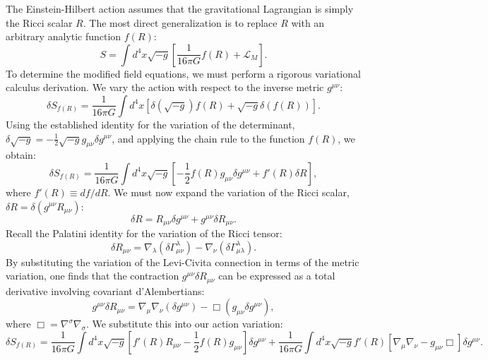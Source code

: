\documentclass[11pt, a4paper]{report}
\begin{document}
The Einstein-Hilbert action assumes that the gravitational Lagrangian is simply the Ricci scalar $R$. The most direct generalization is to replace $R$ with an arbitrary analytic function $f(R)$:
\begin{equation}
\label{eq:fR_action}
S = \int d^{4}x \sqrt{-g} \left[ \frac{1}{16\pi G} f(R) + \mathcal{L}_{M} \right].
\end{equation}
To determine the modified field equations, we must perform a rigorous variational calculus derivation. We vary the action with respect to the inverse metric $g^{\mu\nu}$:
\begin{equation}
\delta S_{f(R)} = \frac{1}{16\pi G} \int d^{4}x \left[ \delta(\sqrt{-g}) f(R) + \sqrt{-g} \delta(f(R)) \right].
\end{equation}
Using the established identity for the variation of the determinant, $\delta\sqrt{-g} = -\frac{1}{2}\sqrt{-g}g_{\mu\nu}\delta g^{\mu\nu}$, and applying the chain rule to the function $f(R)$, we obtain:
\begin{equation}
\delta S_{f(R)} = \frac{1}{16\pi G} \int d^{4}x \sqrt{-g} \left[ -\frac{1}{2}f(R)g_{\mu\nu}\delta g^{\mu\nu} + f'(R)\delta R \right],
\end{equation}
where $f'(R) \equiv df/dR$. We must now expand the variation of the Ricci scalar, $\delta R = \delta(g^{\mu\nu}R_{\mu\nu})$:
\begin{equation}
\label{eq:delta_R_expansion}
\delta R = R_{\mu\nu}\delta g^{\mu\nu} + g^{\mu\nu}\delta R_{\mu\nu}.
\end{equation}
Recall the Palatini identity for the variation of the Ricci tensor:
\begin{equation}
\delta R_{\mu\nu} = \nabla_{\lambda}(\delta \Gamma^{\lambda}_{\mu\nu}) - \nabla_{\nu}(\delta \Gamma^{\lambda}_{\mu\lambda}).
\end{equation}
By substituting the variation of the Levi-Civita connection in terms of the metric variation, one finds that the contraction $g^{\mu\nu}\delta R_{\mu\nu}$ can be expressed as a total derivative involving covariant d'Alembertians:
\begin{equation}
\label{eq:palatini_contracted}
g^{\mu\nu}\delta R_{\mu\nu} = \nabla_{\mu}\nabla_{\nu}(\delta g^{\mu\nu}) - \Box(g_{\mu\nu}\delta g^{\mu\nu}),
\end{equation}
where $\Box = \nabla^{\sigma}\nabla_{\sigma}$. We substitute this into our action variation:
\begin{equation}
\delta S_{f(R)} = \frac{1}{16\pi G} \int d^{4}x \sqrt{-g} \left[ f'(R)R_{\mu\nu} - \frac{1}{2}f(R)g_{\mu\nu} \right] \delta g^{\mu\nu} + \frac{1}{16\pi G} \int d^{4}x \sqrt{-g} f'(R) \left[ \nabla_{\mu}\nabla_{\nu} - g_{\mu\nu}\Box \right] \delta g^{\mu\nu}.
\end{equation}
\end{document}
